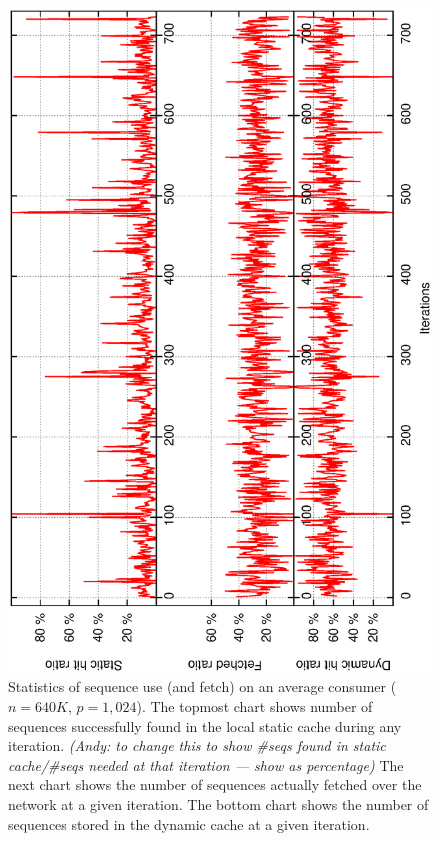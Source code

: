 \documentclass[10pt,journal,letterpaper,compsoc]{IEEEtran}
\begin{document}
\begin{figure}[thb]
\centerline{
						\includegraphics[angle=-90, scale=0.36]{fetch.eps}
            }
\caption{
Statistics of sequence use (and fetch) on an average consumer ($n=640K$, $p=1,024$).
The topmost chart shows number of sequences successfully found in the local static cache during any iteration. {\it (Andy: to change this to show \#seqs found in static cache/\#seqs needed at that iteration --- show as percentage)}
The next chart shows the number of sequences actually fetched over the network at a given iteration. The bottom chart shows the number of sequences stored in the dynamic cache at a given iteration.
}

\label{figConsumerFetch}
\end{figure}
\end{document}
